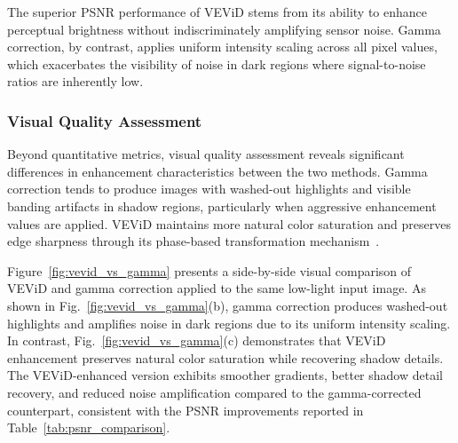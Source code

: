 \documentclass[journal,transmag]{IEEEtran}
\begin{document}
The superior PSNR performance of VEViD stems from its ability to enhance perceptual brightness without indiscriminately amplifying sensor noise. Gamma correction, by contrast, applies uniform intensity scaling across all pixel values, which exacerbates the visibility of noise in dark regions where signal-to-noise ratios are inherently low.

\subsubsection{Visual Quality Assessment}

Beyond quantitative metrics, visual quality assessment reveals significant differences in enhancement characteristics between the two methods. Gamma correction tends to produce images with washed-out highlights and visible banding artifacts in shadow regions, particularly when aggressive enhancement values are applied. VEViD maintains more natural color saturation and preserves edge sharpness through its phase-based transformation mechanism~\cite{zhou2024simplification}.

Figure~\ref{fig:vevid_vs_gamma} presents a side-by-side visual comparison of VEViD and gamma correction applied to the same low-light input image. As shown in Fig.~\ref{fig:vevid_vs_gamma}(b), gamma correction produces washed-out highlights and amplifies noise in dark regions due to its uniform intensity scaling. In contrast, Fig.~\ref{fig:vevid_vs_gamma}(c) demonstrates that VEViD enhancement preserves natural color saturation while recovering shadow details. The VEViD-enhanced version exhibits smoother gradients, better shadow detail recovery, and reduced noise amplification compared to the gamma-corrected counterpart, consistent with the PSNR improvements reported in Table~\ref{tab:psnr_comparison}.
\end{document}
